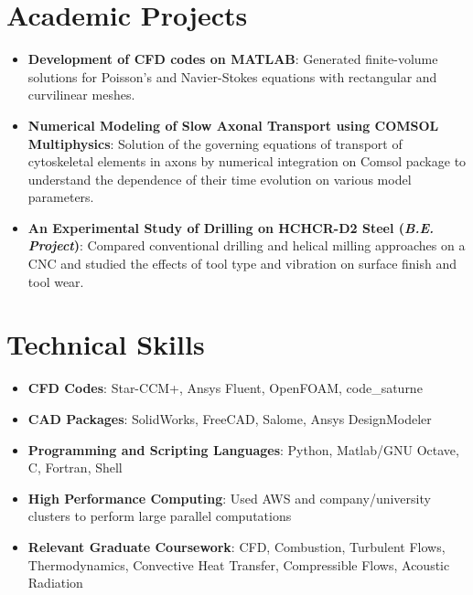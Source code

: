 \documentclass[letterpaper,11pt]{article}
\newcommand{\resumeItem}[2]{
	\item\small{
		\textbf{#1}{: #2 \vspace{-2pt}}
	}
}
\newcommand{\resumeSubItem}[2]{\resumeItem{#1}{#2}\vspace{-4pt}}
\newcommand{\resumeSubHeadingListStart}{\begin{itemize}[leftmargin=*]}
\newcommand{\resumeSubHeadingListEnd}{\end{itemize}}
\begin{document}
	\section{Academic Projects}
	\resumeSubHeadingListStart
	\resumeSubItem{Development of CFD codes on MATLAB}
	{Generated finite-volume solutions for Poisson\textquoteright s and Navier-Stokes equations with rectangular and curvilinear meshes.}
	\resumeSubItem{Numerical Modeling of Slow Axonal Transport using COMSOL Multiphysics}
	{Solution of the
governing equations of transport of cytoskeletal elements in axons by numerical integration
on Comsol package to understand the dependence of their time evolution on various model parameters.}
	\resumeSubItem{An Experimental Study of Drilling on HCHCR-D2 Steel (\textit{B.E. Project})}
	{Compared conventional drilling and helical milling approaches on a CNC and studied the effects of tool type and vibration on surface finish and tool wear.}
	\resumeSubHeadingListEnd
	
	\section{Technical Skills}
	\resumeSubHeadingListStart
	\resumeSubItem{CFD Codes}
	{Star-CCM+, Ansys Fluent, OpenFOAM, code\_saturne}
	\resumeSubItem{CAD Packages}
	{SolidWorks, FreeCAD, Salome, Ansys DesignModeler}
	\resumeSubItem{Programming and Scripting Languages}
	{Python, Matlab/GNU Octave, C, Fortran, Shell}
	\resumeSubItem{High Performance Computing}
	{Used AWS and company/university clusters to perform large parallel computations}
	\resumeSubItem{Relevant Graduate Coursework}
	{CFD, Combustion, Turbulent Flows, Thermodynamics, Convective Heat Transfer, Compressible Flows, Acoustic Radiation}
	\resumeSubHeadingListEnd
	
\end{document}

